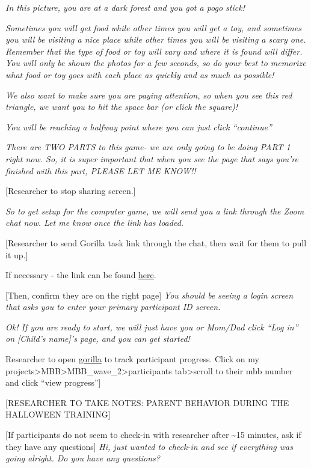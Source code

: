 \documentclass[
]{book}
\begin{document}
\emph{In this picture, you are at a dark forest and you got a pogo stick!}

\emph{Sometimes you will get food while other times you will get a toy, and sometimes you will be visiting a nice place while other times you will be visiting a scary one. Remember that the type of food or toy will vary and where it is found will differ. You will only be shown the photos for a few seconds, so do your best to memorize what food or toy goes with each place as quickly and as much as possible!}

\emph{We also want to make sure you are paying attention, so when you see this red triangle, we want you to hit the space bar (or click the square)!}

\emph{You will be reaching a halfway point where you can just click ``continue''}

\emph{There are TWO PARTS to this game- we are only going to be doing PART 1 right now. So, it is super important that when you see the page that says you're finished with this part, PLEASE LET ME KNOW!!}

{[}Researcher to stop sharing screen.{]}

\emph{So to get setup for the computer game, we will send you a link through the Zoom chat now. Let me know once the link has loaded.}

{[}Researcher to send Gorilla task link through the chat, then wait for them to pull it up.{]}

If necessary - the link can be found \href{https://research.sc/participant/login/39409/publicid}{here}.

{[}Then, confirm they are on the right page{]} \emph{You should be seeing a login screen that asks you to enter your primary participant ID screen.}

\emph{Ok! If you are ready to start, we will just have you or Mom/Dad click ``Log in'' on {[}Child's name{]}'s page, and you can get started!}

Researcher to open \href{https://gorilla.sc}{gorilla} to track participant progress. Click on my projects\textgreater MBB\textgreater MBB\_wave\_2\textgreater participants tab\textgreater scroll to their mbb number and click ``view progress''{]}

{[}RESEARCHER TO TAKE NOTES: PARENT BEHAVIOR DURING THE HALLOWEEN TRAINING{]}

{[}If participants do not seem to check-in with researcher after \textasciitilde15 minutes, ask if they have any questions{]} \emph{Hi, just wanted to check-in and see if everything was going alright. Do you have any questions?}
\end{document}
